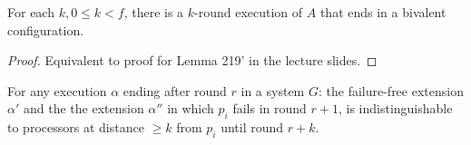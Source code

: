 \begin{lemma}
For each $k, 0 \leq k < f$, there is a $k$-round execution of $A$ that ends in
a bivalent configuration.
\end{lemma}

\begin{proof}
Equivalent to proof for Lemma 219' in the lecture slides.
\end{proof}

\begin{lemma} \label{lemma:indist_dist}
For any execution $\alpha$ ending after round $r$ in a system $G$: the failure-free
extension $\alpha'$ and the the extension $\alpha''$ in which $p_i$ fails in round $r+1$,
is indistinguishable to processors at distance $\geq k$ from $p_i$ until round $r+k$.
\end{lemma}

